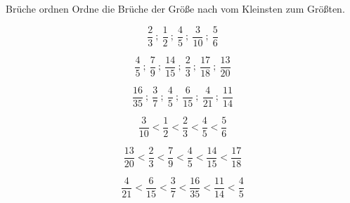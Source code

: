 \documentclass[12pt,a5paper,landscape]{scrartcl}
\begin{document}
	\begin{karte1}{Brüche ordnen}
		Ordne die Brüche der Größe nach vom Kleinsten zum Größten.
		
		\begin{enumeratea}
			\item \[ \frac{2}{3}\:;\ \frac{1}{2}\:;\ \frac{4}{5}\:;\ \frac{3}{10}\:;\ \frac{5}{6} \]
			
			\item \[ \frac{4}{5}\:;\ \frac{7}{9}\:;\ \frac{14}{15}\:;\ \frac{2}{3}\:;\ \frac{17}{18}\:;\ \frac{13}{20} \]
			
			\item \[ \frac{16}{35}\:;\ \frac{3}{7}\:;\ \frac{4}{5}\:;\ \frac{6}{15}\:;\ \frac{4}{21}\:;\ \frac{11}{14} \]
		\end{enumeratea}
	\end{karte1}
	
	\begin{loesungskarte}
		\begin{enumeratea}
			\item \[ \frac{3}{10} < \frac{1}{2} < \frac{2}{3} < \frac{4}{5} < \frac{5}{6} \]
			
			\item \[ \frac{13}{20} < \frac{2}{3} < \frac{7}{9} < \frac{4}{5} < \frac{14}{15} < \frac{17}{18} \]
			
			\item \[ \frac{4}{21} < \frac{6}{15} < \frac{3}{7} < \frac{16}{35} < \frac{11}{14} < \frac{4}{5} \]
		\end{enumeratea}
	\end{loesungskarte}
	
\end{document}
